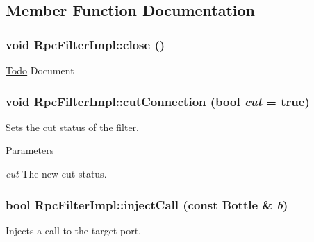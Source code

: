 \subsection{Member Function Documentation}
\hypertarget{classyarp_1_1os_1_1impl_1_1_rpc_filter_impl_a6617044e3948a5fa890a68a918d93c72}{
\subsubsection[{close}]{\setlength{\rightskip}{0pt plus 5cm}void RpcFilterImpl::close ()}}
\label{classyarp_1_1os_1_1impl_1_1_rpc_filter_impl_a6617044e3948a5fa890a68a918d93c72}
\begin{Desc}
\item[\hyperlink{todo__todo000003}{Todo}]Document \end{Desc}
\hypertarget{classyarp_1_1os_1_1impl_1_1_rpc_filter_impl_a3c3f3382e223f75955459fc29bbd9e3d}{
\subsubsection[{cutConnection}]{\setlength{\rightskip}{0pt plus 5cm}void RpcFilterImpl::cutConnection (bool {\em cut} = {\ttfamily true})}}
\label{classyarp_1_1os_1_1impl_1_1_rpc_filter_impl_a3c3f3382e223f75955459fc29bbd9e3d}
Sets the cut status of the filter. 
\begin{DoxyParams}{Parameters}
\item[{\em cut}]The new cut status. \end{DoxyParams}
\hypertarget{classyarp_1_1os_1_1impl_1_1_rpc_filter_impl_a0f795cf3383a030884a7fde9843de1f7}{
\subsubsection[{injectCall}]{\setlength{\rightskip}{0pt plus 5cm}bool RpcFilterImpl::injectCall (const Bottle \& {\em b})}}
\label{classyarp_1_1os_1_1impl_1_1_rpc_filter_impl_a0f795cf3383a030884a7fde9843de1f7}
Injects a call to the target port. 
